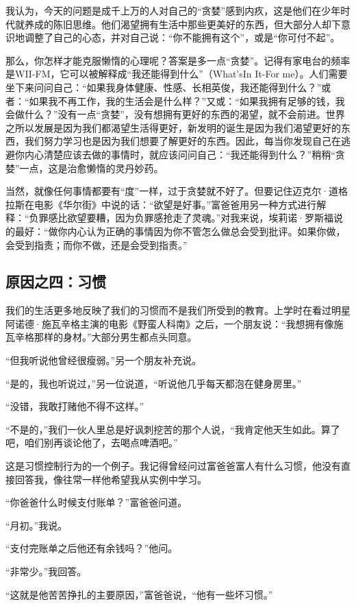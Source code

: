 我认为，今天的问题是成千上万的人对自己的“贪婪”感到内疚，这是他们在少年时代就养成的陈旧思维。他们渴望拥有生活中那些更美好的东西，但大部分人却下意识地调整了自己的心态，并对自己说：“你不能拥有这个”，或是“你可付不起”。

那么，你怎样才能克服懒惰的心理呢？答案是多一点“贪婪”。记得有家电台的频率是WII-FM，它可以被解释成“我还能得到什么”（What'sIn It-For me）。人们需要坐下来问问自己：“如果我身体健康、性感、长相英俊，我还能得到什么？”或者：“如果我不再工作，我的生活会是什么样？”又或：“如果我拥有足够的钱，我会做什么？”没有一点“贪婪”，没有想拥有更好的东西的渴望，就不会前进。世界之所以发展是因为我们都渴望生活得更好，新发明的诞生是因为我们渴望更好的东西，我们努力学习也是因为我们想要了解更好的东西。因此，每当你发现自己在逃避你内心清楚应该去做的事情时，就应该问问自己：“我还能得到什么？”稍稍“贪婪”一点，这是治愈懒惰的灵丹妙药。

当然，就像任何事情都要有“度”一样，过于贪婪就不好了。但要记住迈克尔·道格拉斯在电影《华尔街》中说的话：“欲望是好事。”富爸爸用另一种方式进行解释：“负罪感比欲望要糟，因为负罪感抢走了灵魂。”对我来说，埃莉诺·罗斯福说的最好：“做你内心认为正确的事情因为你不管怎么做总会受到批评。如果你做，会受到指责；而你不做，还是会受到指责。”

\subsection*{原因之四：习惯}


我们的生活更多地反映了我们的习惯而不是我们所受到的教育。上学时在看过明星阿诺德·施瓦辛格主演的电影《野蛮人科南》之后，一个朋友说：“我想拥有像施瓦辛格那样的身材。”大部分男生都点头同意。

“但我听说他曾经很瘦弱。”另一个朋友补充说。

“是的，我也听说过，”另一位说道，“听说他几乎每天都泡在健身房里。”

“没错，我敢打赌他不得不这样。”

“不是的，”我们一伙人里总是好讽刺挖苦的那个人说，“我肯定他天生如此。算了吧，咱们别再谈论他了，去喝点啤酒吧。”

这是习惯控制行为的一个例子。我记得曾经问过富爸爸富人有什么习惯，他没有直接回答我，像往常一样他希望我从实例中学习。

“你爸爸什么时候支付账单？”富爸爸问道。

“月初。”我说。

“支付完账单之后他还有余钱吗？”他问。

“非常少。”我回答。

“这就是他苦苦挣扎的主要原因，”富爸爸说，“他有一些坏习惯。”


